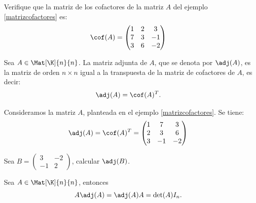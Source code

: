 \documentclass[compacto,10pt]{pubciencias-notas}
\begin{document}
\begin{ejer}
    Verifique que la matriz de los cofactores de la matriz $A$ del ejemplo \ref{matrizcofactores} es: \[ \cof(A) = 
    \begin{pmatrix}
            1 & 2 & 3\\
            7 & 3 & -1 \\
            3 & 6 & -2
        \end{pmatrix}
    \]
\end{ejer}

\begin{defi}
Sea $A\in\Mat[\K]{n}{n}$. La matriz adjunta de $A$, que se denota por $\adj(A)$, es la matriz de orden $n \times n$ igual a la transpuesta de la matriz de cofactores de $A$, es decir:
\[
    \adj(A) = \cof(A)^{T}.
\]
\end{defi}

\begin{ejem}
    Consideramos la matriz $A$, planteada en el ejemplo \ref{matrizcofactores}. Se tiene:
    \[
        \adj(A) = \cof(A)^{T} =
        \begin{pmatrix}
            1 & 7 & 3 \\
            2 & 3 & 6 \\
            3 & -1 & -2
        \end{pmatrix}
    \]
\end{ejem}

\begin{ejer}\label{matcofej}
    Sea $B = 
    \begin{pmatrix}
        3 & -2 \\
        -1 & 2
    \end{pmatrix}$, calcular $\adj(B)$.   
\end{ejer}

\begin{teo}
Sea $A\in\Mat[\K]{n}{n}$, entonces
\[
    A \adj(A) = \adj(A) A = \det(A) I_{n}.
\]
\end{teo}
\end{document}

